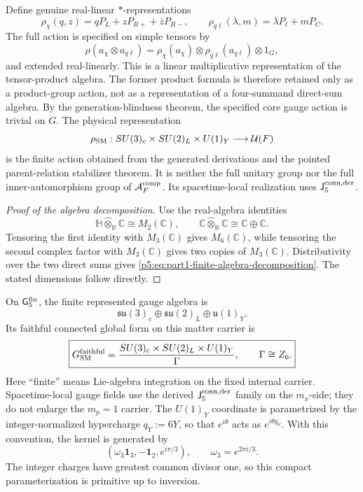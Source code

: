 \documentclass[11pt,a4paper]{article}
\begin{document}
Define genuine real-linear \(*\)-representations
\[
\rho_\chi(q,z)=qP_L+zP_{R+}+\bar z P_{R-},
\qquad
\rho_{q\ell}(\lambda,m)=\lambda P_\ell+mP_C.
\]
The full action is specified on simple tensors by
\begin{equation}
\label{p5:eq:part1-finite-rep}
\rho(a_\chi\otimes a_{q\ell})
=
\rho_\chi(a_\chi)\otimes\rho_{q\ell}(a_{q\ell})\otimes1_G,
\end{equation}
and extended real-linearly.  This is a linear multiplicative representation
of the tensor-product algebra.  The former product formula is therefore
retained only as a product-group action, not as a representation of a
four-summand direct-sum algebra.  By the generation-blindness theorem, the
specified core gauge action is trivial on \(G\).
The physical representation
\[
\rho_{\rm SM}:SU(3)_c\times SU(2)_L\times U(1)_Y\longrightarrow\mathcal U(F)
\]
is the finite action obtained from the generated derivations and the pointed
parent-relation stabilizer theorem.  It is neither the full unitary group
nor the full inner-automorphism group of \(\mathcal A_F^{\rm comp}\).  Its
spacetime-local realization uses \(\mathsf J_5^{\rm conn,der}\).

\begin{proof}[Proof of the algebra decomposition]
Use the real-algebra identities
\[
\mathbb H\widehat\otimes_{\mathbb R}\mathbb C\cong M_2(\mathbb C),
\qquad
\mathbb C\widehat\otimes_{\mathbb R}\mathbb C\cong\mathbb C\oplus\mathbb C.
\]
Tensoring the first identity with \(M_3(\mathbb C)\) gives
\(M_6(\mathbb C)\), while tensoring the second complex factor with
\(M_3(\mathbb C)\) gives two copies of \(M_3(\mathbb C)\).
Distributivity over the two direct sums gives
\eqref{p5:eq:part1-finite-algebra-decomposition}.  The stated dimensions
follow directly.
\end{proof}

\begin{proposition}
\label{p5:prop:faithful-global-sm-group}
On \(\mathsf G_5^{\rm fin}\), the finite represented gauge
algebra is
\[
\mathfrak{su}(3)_c\oplus\mathfrak{su}(2)_L\oplus\mathfrak u(1)_Y.
\]
Its faithful connected global form on this matter carrier is
\[
\boxed{
G_{\rm SM}^{\rm faithful}
=
\frac{SU(3)_c\times SU(2)_L\times U(1)_Y}{\Gamma},
\qquad
\Gamma\cong Z_6 .
}
\]
Here ``finite'' means Lie-algebra integration on the fixed internal carrier.
Spacetime-local gauge fields use the derived
\(\mathsf J_5^{\rm conn,der}\) family on the \(m_x\)-side; they do not enlarge
the \(m_p=1\) carrier.  The \(U(1)_Y\) coordinate is parametrized by the integer-normalized hypercharge \(q_Y:=6Y\), so that \(e^{i\theta}\) acts as \(e^{i\theta q_Y}\).  With this convention, the kernel is generated by
\[
\left(\omega_3\mathbf 1_3,-\mathbf 1_2,e^{i\pi/3}\right),
\qquad
\omega_3=e^{2\pi i/3}.
\]
The integer charges have greatest common divisor one, so this compact
parameterization is primitive up to inversion.
\end{proposition}
\end{document}
